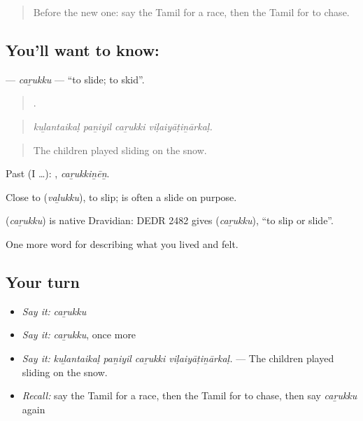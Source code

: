 \label{lesson:TA-C533-carukku}



\begin{quote}
Before the new one: say the Tamil for a race, then the Tamil for to chase.
\end{quote}

\subsection*{You'll want to know: }
\textbf{} — \emph{caṟukku} — \textquotedblleft{}to slide; to skid\textquotedblright{}.

\begin{quote}
   .
\end{quote}

\begin{quote}
\emph{kuḻantaikaḷ paṉiyil caṟukki viḷaiyāṭiṉārkaḷ.}
\end{quote}

\begin{quote}
The children played sliding on the snow.
\end{quote}

Past (I …): , \emph{caṟukkiṉēṉ}.

Close to  (\emph{vaḻukku}), to slip;  is often a slide on purpose.

\begin{cousinweb}
\textbf{} (\emph{caṟukku}) is native Dravidian: DEDR 2482 gives  (\emph{caṟukku}), \textquotedblleft{}to slip or slide\textquotedblright{}.
\end{cousinweb}

\begin{grammarlens}[title={What you've built}]
One more word for describing what you lived and felt.
\end{grammarlens}

\subsection*{Your turn}
\begin{itemize}
\raggedright
  \item \emph{Say it:} \emph{caṟukku}
  \item \emph{Say it:} \emph{caṟukku}, once more
  \item \emph{Say it:} \emph{kuḻantaikaḷ paṉiyil caṟukki viḷaiyāṭiṉārkaḷ.} — The children played sliding on the snow.
  \item \emph{Recall:} say the Tamil for a race, then the Tamil for to chase, then say \emph{caṟukku} again
\end{itemize}

